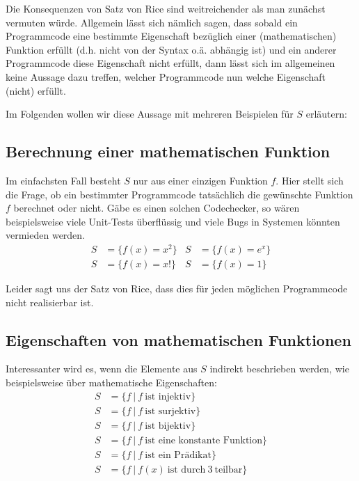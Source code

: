 \documentclass[journal]{IEEEtran}
\begin{document}
Die Konsequenzen von Satz von Rice sind weitreichender als man zunächst vermuten würde. Allgemein lässt sich nämlich sagen, dass sobald ein Programmcode eine bestimmte Eigenschaft bezüglich einer (mathematischen) Funktion erfüllt (d.h. nicht von der Syntax o.ä. abhängig ist) und ein anderer Programmcode diese Eigenschaft nicht erfüllt, dann lässt sich im allgemeinen keine Aussage dazu treffen, welcher Programmcode nun welche Eigenschaft (nicht) erfüllt.

Im Folgenden wollen wir diese Aussage mit mehreren Beispielen für $S$ erläutern:

\subsection{Berechnung einer mathematischen Funktion}

Im einfachsten Fall besteht $S$ nur aus einer einzigen Funktion $f$. Hier stellt sich die Frage, ob ein bestimmter Programmcode tatsächlich die gewünschte Funktion $f$ berechnet oder nicht. Gäbe es einen solchen Codechecker, so wären beispielsweise viele Unit-Tests überflüssig und viele Bugs in Systemen könnten vermieden werden.
\begin{align*}
S &= \{f(x) = x^2 \} &S &= \{ f(x) = e^x \} \\
S &= \{f(x) = x! \}  &S &= \{ f(x) = 1 \}
\end{align*}

Leider sagt uns der Satz von Rice, dass dies für jeden möglichen Programmcode nicht realisierbar ist.

\subsection{Eigenschaften von mathematischen Funktionen}

Interessanter wird es, wenn die Elemente aus $S$ indirekt beschrieben werden, wie beispielsweise über mathematische Eigenschaften:
\begin{align*}
S &= \{ f \ \vert \ f \ \text{ist injektiv} \} \\
S &= \{ f \ \vert \ f \ \text{ist surjektiv} \} \\
S &= \{ f \ \vert \ f \ \text{ist bijektiv} \} \\
S &= \{ f \ \vert \ f \ \text{ist eine konstante Funktion} \} \\
S &= \{ f \ \vert \ f \ \text{ist ein Prädikat} \} \\
S &= \{ f \ \vert \ f(x) \ \text{ist durch} \ 3 \ \text{teilbar} \} \\
\end{align*}
\end{document}
